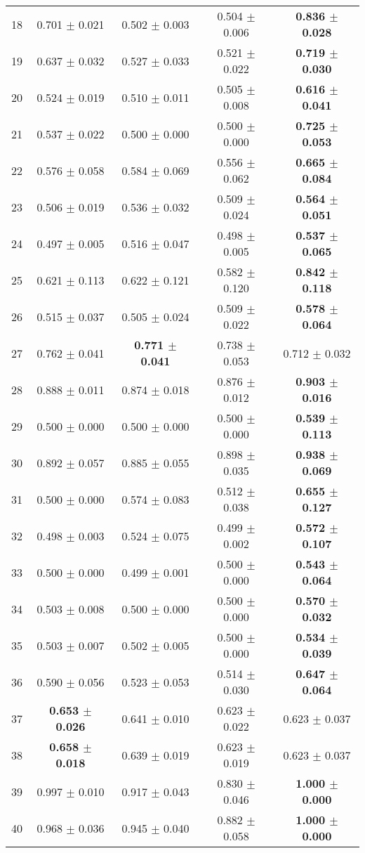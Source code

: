 \begin{table}[!ht]
{\begin{tabular}{r c c c c}
18 & 0.701 $\pm$ 0.021 & 0.502 $\pm$ 0.003 & 0.504 $\pm$ 0.006 & \textbf{0.836 $\pm$ 0.028} \\
19 & 0.637 $\pm$ 0.032 & 0.527 $\pm$ 0.033 & 0.521 $\pm$ 0.022 & \textbf{0.719 $\pm$ 0.030} \\
20 & 0.524 $\pm$ 0.019 & 0.510 $\pm$ 0.011 & 0.505 $\pm$ 0.008 & \textbf{0.616 $\pm$ 0.041} \\
21 & 0.537 $\pm$ 0.022 & 0.500 $\pm$ 0.000 & 0.500 $\pm$ 0.000 & \textbf{0.725 $\pm$ 0.053} \\
22 & 0.576 $\pm$ 0.058 & 0.584 $\pm$ 0.069 & 0.556 $\pm$ 0.062 & \textbf{0.665 $\pm$ 0.084} \\
23 & 0.506 $\pm$ 0.019 & 0.536 $\pm$ 0.032 & 0.509 $\pm$ 0.024 & \textbf{0.564 $\pm$ 0.051} \\
24 & 0.497 $\pm$ 0.005 & 0.516 $\pm$ 0.047 & 0.498 $\pm$ 0.005 & \textbf{0.537 $\pm$ 0.065} \\
25 & 0.621 $\pm$ 0.113 & 0.622 $\pm$ 0.121 & 0.582 $\pm$ 0.120 & \textbf{0.842 $\pm$ 0.118} \\
26 & 0.515 $\pm$ 0.037 & 0.505 $\pm$ 0.024 & 0.509 $\pm$ 0.022 & \textbf{0.578 $\pm$ 0.064} \\
27 & 0.762 $\pm$ 0.041 & \textbf{0.771 $\pm$ 0.041} & 0.738 $\pm$ 0.053 & 0.712 $\pm$ 0.032 \\
28 & 0.888 $\pm$ 0.011 & 0.874 $\pm$ 0.018 & 0.876 $\pm$ 0.012 & \textbf{0.903 $\pm$ 0.016} \\
29 & 0.500 $\pm$ 0.000 & 0.500 $\pm$ 0.000 & 0.500 $\pm$ 0.000 & \textbf{0.539 $\pm$ 0.113} \\
30 & 0.892 $\pm$ 0.057 & 0.885 $\pm$ 0.055 & 0.898 $\pm$ 0.035 & \textbf{0.938 $\pm$ 0.069} \\
31 & 0.500 $\pm$ 0.000 & 0.574 $\pm$ 0.083 & 0.512 $\pm$ 0.038 & \textbf{0.655 $\pm$ 0.127} \\
32 & 0.498 $\pm$ 0.003 & 0.524 $\pm$ 0.075 & 0.499 $\pm$ 0.002 & \textbf{0.572 $\pm$ 0.107} \\
33 & 0.500 $\pm$ 0.000 & 0.499 $\pm$ 0.001 & 0.500 $\pm$ 0.000 & \textbf{0.543 $\pm$ 0.064} \\
34 & 0.503 $\pm$ 0.008 & 0.500 $\pm$ 0.000 & 0.500 $\pm$ 0.000 & \textbf{0.570 $\pm$ 0.032} \\
35 & 0.503 $\pm$ 0.007 & 0.502 $\pm$ 0.005 & 0.500 $\pm$ 0.000 & \textbf{0.534 $\pm$ 0.039} \\
36 & 0.590 $\pm$ 0.056 & 0.523 $\pm$ 0.053 & 0.514 $\pm$ 0.030 & \textbf{0.647 $\pm$ 0.064} \\
37 & \textbf{0.653 $\pm$ 0.026} & 0.641 $\pm$ 0.010 & 0.623 $\pm$ 0.022 & 0.623 $\pm$ 0.037 \\
38 & \textbf{0.658 $\pm$ 0.018} & 0.639 $\pm$ 0.019 & 0.623 $\pm$ 0.019 & 0.623 $\pm$ 0.037 \\
39 & 0.997 $\pm$ 0.010 & 0.917 $\pm$ 0.043 & 0.830 $\pm$ 0.046 & \textbf{1.000 $\pm$ 0.000} \\
40 & 0.968 $\pm$ 0.036 & 0.945 $\pm$ 0.040 & 0.882 $\pm$ 0.058 & \textbf{1.000 $\pm$ 0.000} \\
\end{tabular}}
\end{table}
